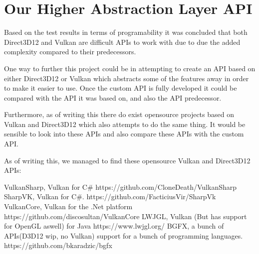 \section{Our Higher Abstraction Layer API}\label{sec:abstraction_layer}
\begin{sectionmeta}
\end{sectionmeta}

Based on the test results in terms of programability it was concluded that both Direct3D12 and Vulkan are difficult \glspl{API} to work with due to due the added complexity compared to their predecessors.

One way to further this project could be in attempting to create an \gls{API} based on either Direct3D12 or Vulkan which abstracts some of the features away in order to make it easier to use. Once the custom \gls{API} is fully developed it could be compared with the \gls{API} it was based on, and also the \gls{API} predecessor. 

Furthermore, as of writing this there do exist opensource projects based on Vulkan and Direct3D12 which also attempts to do the same thing. It would be sensible to look into these \glspl{API} and also compare these \glspl{API} with the custom \gls{API}.

As of writing this, we managed to find these opensource Vulkan and Direct3D12 \glspl{API}: 

VulkanSharp, Vulkan for C\# https://github.com/CloneDeath/VulkanSharp 
SharpVK, Vulkan for C\#. https://github.com/FacticiusVir/SharpVk 
VulkanCore, Vulkan for the .Net platform https://github.com/discosultan/VulkanCore 
LWJGL, Vulkan (But has support for OpenGL aswell) for Java https://www.lwjgl.org/ 
BGFX, a bunch of \glspl{API}(D3D12 wip, no Vulkan) support for a bunch of programming languages. https://github.com/bkaradzic/bgfx 


